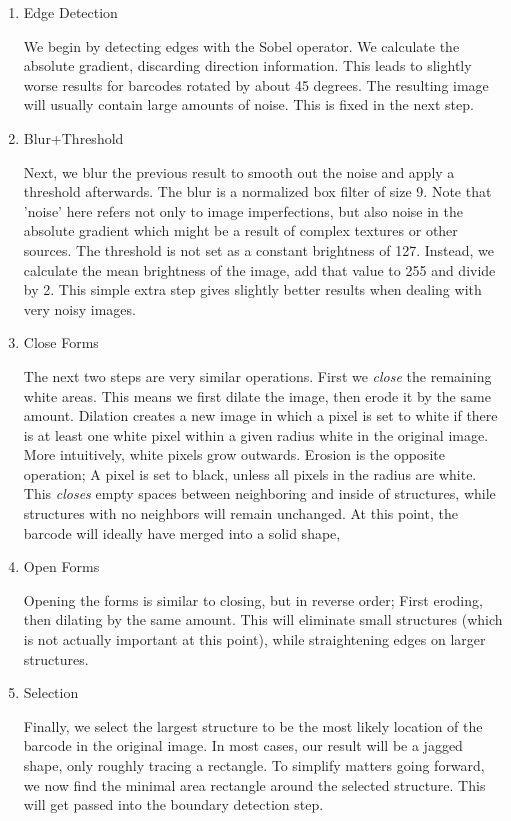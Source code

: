 \begin{enumerate}
	\item Edge Detection
	
	We begin by detecting edges with the Sobel operator. We calculate the absolute gradient, discarding direction information. This leads to slightly worse results for barcodes rotated by about 45 degrees. The resulting image will usually contain large amounts of noise. This is fixed in the next step. 

	\item Blur+Threshold
	
	Next, we blur the previous result to smooth out the noise and apply a threshold afterwards. The blur is a normalized box filter of size 9. Note that 'noise' here refers not only to image imperfections, but also noise in the absolute gradient which might be a result of complex textures or other sources. The threshold is not set as a constant brightness of 127. Instead, we calculate the mean brightness of the image, add that value to 255 and divide by 2. This simple extra step gives slightly better results when dealing with very noisy images.
	
	\item Close Forms
	
	The next two steps are very similar operations. First we \emph{close} the remaining white areas. This means we first dilate the image, then erode it by the same amount. Dilation creates a new image in which a pixel is set to white if there is at least one white pixel within a given radius white in the original image. More intuitively, white pixels grow outwards. Erosion is the opposite operation; A pixel is set to black, unless all pixels in the radius are white.  This \emph{closes} empty spaces between neighboring and inside of structures, while structures with no neighbors will remain unchanged. At this point, the barcode will ideally have merged into a solid shape, 
	
	\item Open Forms
	
	Opening the forms is similar to closing, but in reverse order; First eroding, then dilating by the same amount. This will eliminate small structures (which is not actually important at this point), while straightening edges on larger structures. 
	
	\item Selection
	
	Finally, we select the largest structure to be the most likely location of the barcode in the original image. In most cases, our result will be a jagged shape, only roughly tracing a rectangle. To simplify matters going forward, we now find the minimal area rectangle around the selected structure. This will get passed into the boundary detection step.
\end{enumerate}

